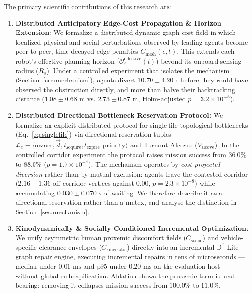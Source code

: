 \documentclass[journal]{IEEEtran}
\begin{document}
The primary scientific contributions of this research are:
\begin{enumerate}
    \item \textbf{Distributed Anticipatory Edge-Cost Propagation \& Horizon Extension:} We formalize a distributed dynamic graph-cost field in which localized physical and social perturbations observed by leading agents become peer-to-peer, time-decayed edge penalties $C_{\text{mesh}}(e, t)$. This extends each robot's effective planning horizon ($\mathcal{O}_i^{\text{effective}}(t)$) beyond its onboard sensing radius ($R_s$). Under a controlled experiment that isolates the mechanism (Section~\ref{sec:mechanism}), agents divert $10.70 \pm 4.20\text{ s}$ before they could have observed the obstruction directly, and more than halve their backtracking distance ($1.08 \pm 0.68\text{ m}$ vs. $2.73 \pm 0.87\text{ m}$, Holm-adjusted $p = 3.2 \times 10^{-8}$).
    \item \textbf{Distributed Directional Bottleneck Reservation Protocol:} We formalize an explicit distributed protocol for single-file topological bottlenecks (Eq.~\eqref{eq:singlefile}) via directional reservation tuples $\mathcal{L}_e = \langle \text{owner}, \vec{d}, t_{\text{acquire}}, t_{\text{expire}}, \text{priority} \rangle$ and Turnout Alcoves ($V_{\text{alcove}}$). In the controlled corridor experiment the protocol raises mission success from $36.0\%$ to $88.0\%$ ($p = 1.7 \times 10^{-4}$). The mechanism operates by \emph{cost-projected diversion} rather than by mutual exclusion: agents leave the contested corridor ($2.16 \pm 1.36$ off-corridor vertices against $0.00$, $p = 2.3 \times 10^{-8}$) while accumulating $0.030 \pm 0.070\text{ s}$ of waiting. We therefore describe it as a directional reservation rather than a mutex, and analyse the distinction in Section~\ref{sec:mechanism}.
    \item \textbf{Kinodynamically \& Socially Conditioned Incremental Optimization:} We unify asymmetric human proxemic discomfort fields ($C_{\text{social}}$) and vehicle-specific clearance envelopes ($C_{\text{kinematic}}$) directly into an incremental $\text{D}^*$ Lite graph repair engine, executing incremental repairs in tens of microseconds --- median under $0.01\text{ ms}$ and p95 under $0.20\text{ ms}$ on the evaluation host --- without global re-heapification. Ablation shows the proxemic term is load-bearing: removing it collapses mission success from $100.0\%$ to $11.0\%$.

\end{enumerate}
\end{document}
